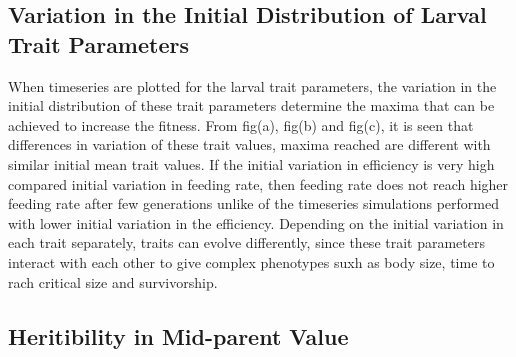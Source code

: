 \subsection{Variation in the Initial Distribution of Larval Trait Parameters}
When timeseries are plotted for the larval trait parameters, the variation in the initial distribution of these trait parameters determine the maxima that can be achieved to increase the fitness. From fig(a), fig(b) and fig(c), it is seen that differences in variation of these trait values, maxima reached are different with similar initial mean trait values. If the initial variation in efficiency is very high compared initial variation in feeding rate, then feeding rate does not reach higher feeding rate after few generations unlike of the timeseries simulations performed with lower initial variation in the efficiency. Depending on the initial variation in each trait separately, traits can evolve differently, since these trait parameters interact with each other to give complex phenotypes suxh as body size, time to rach critical size and survivorship.
\subsection{Heritibility in Mid-parent Value}


\pagebreak



